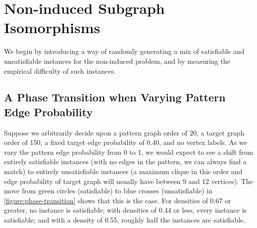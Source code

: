 \documentclass[twoside,11pt]{article}
\begin{document}
\section{Non-induced Subgraph Isomorphisms}\label{section:non-induced}

We begin by introducing a way of randomly generating a mix of satisfiable and unsatisfiable
instances for the non-induced problem, and by measuring the empirical difficulty of such instances.

\subsection{A Phase Transition when Varying Pattern Edge Probability}

Suppose we arbitrarily decide upon a pattern graph order of 20, a target graph order of 150, a fixed
target edge probability of 0.40, and no vertex labels. As we vary the pattern edge probability from
0 to 1, we would expect to see a shift from entirely satisfiable instances (with no edges in the
pattern, we can always find a match) to entirely unsatisfiable instances (a maximum clique in this
order and edge probability of target graph will usually have between 9 and 12 vertices). The move
from green circles (satisfiable) to blue crosses (unsatisfiable) in \cref{figure:phase-transition}
shows that this is the case. For densities of 0.67 or greater, no instance is satisfiable; with
densities of 0.44 or less, every instance is satisfiable; and with a density of 0.55, roughly half
the instances are satisfiable.
\end{document}
